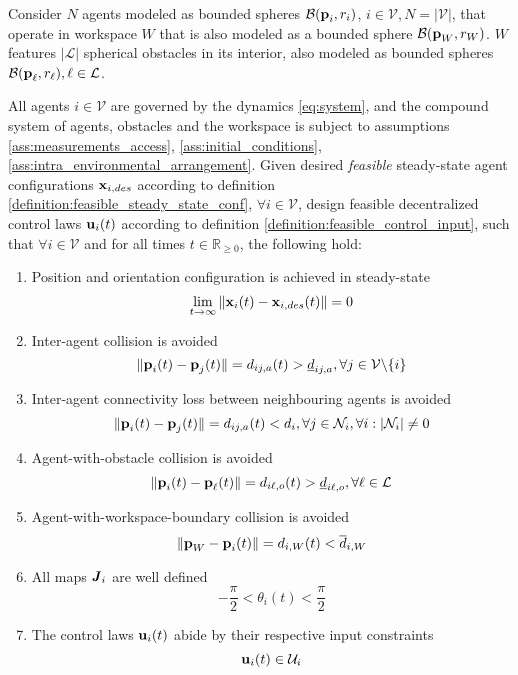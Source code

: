 \begin{bg_box}
\label{problem}
\begin{problem}
  Consider $N$ agents modeled as bounded spheres $\mathcal{B}(\bm{\mathbf{p}}_i, r_i)$,
  $i \in \mathcal{V}, N = |\mathcal{V}|$, that operate in workspace $W$ that is
  also modeled as a bounded sphere $\mathcal{B}(\bm{\mathbf{p}}_W,r_W)$. $W$
  features $|\mathcal{L}|$ spherical obstacles in its interior, also modeled as
  bounded spheres $\mathcal{B}(\bm{\mathbf{p}}_{\ell}, r_{\ell}), \ell \in \mathcal{L}$.

  All agents $i \in \mathcal{V}$ are governed by the dynamics \eqref{eq:system},
  and the compound system of agents, obstacles and the workspace is subject to
  assumptions \eqref{ass:measurements_access}, \eqref{ass:initial_conditions},
  \eqref{ass:intra_environmental_arrangement}. Given desired \textit{feasible}
  steady-state agent configurations $\bm{\mathbf{x}}_{i,des}$ according to definition
  \eqref{definition:feasible_steady_state_conf},
  $\forall i \in \mathcal{V}$, design feasible decentralized control laws
  $\bm{\mathbf{u}}_i(t)$ according to definition \eqref{definition:feasible_control_input},
  such that $\forall i \in \mathcal{V}$ and for all times $t \in \mathbb{R}_{\geq 0}$,
  the following hold:

  \begin{enumerate}

    \item Position and orientation configuration is achieved in steady-state
      $$\lim_{t \to \infty} \|\bm{\mathbf{x}}_i(t) - \bm{\mathbf{x}}_{i,des}(t)\| = 0$$

    \item Inter-agent collision is avoided
      $$\|\bm{\mathbf{p}}_i(t) - \bm{\mathbf{p}}_j(t)\| = d_{ij,a}(t) > \underline{d}_{ij,a},
      \forall j \in \mathcal{V} \backslash \{i\}$$

    \item Inter-agent connectivity loss between neighbouring agents is avoided
      $$ \|\bm{\mathbf{p}}_i(t) - \bm{\mathbf{p}}_j(t)\| = d_{ij,a} (t) < d_i,
      \forall j \in \mathcal{N}_i, \forall i : |\mathcal{N}_i| \not= 0$$

    \item Agent-with-obstacle collision is avoided
      $$ \|\bm{\mathbf{p}}_i(t) - \bm{\mathbf{p}}_{\ell}(t)\| = d_{i\ell,o} (t) > \underline{d}_{i\ell,o},
      \forall \ell \in \mathcal{L}$$

    \item Agent-with-workspace-boundary collision is avoided
      $$ \|\bm{\mathbf{p}}_W - \bm{\mathbf{p}}_i(t)\| = d_{i,W} (t) < \overline{d}_{i,W}$$

    \item All maps $\bm{\mathit{J}}_i$ are well defined
      $$- \frac{\pi}{2} < \theta_i(t) < \frac{\pi}{2}$$

    \item The control laws $\bm{\mathbf{u}}_i(t)$ abide by their respective input constraints
      $$\bm{\mathbf{u}}_i(t) \in \mathcal{U}_i$$

  \end{enumerate}
\end{problem}
\end{bg_box}
